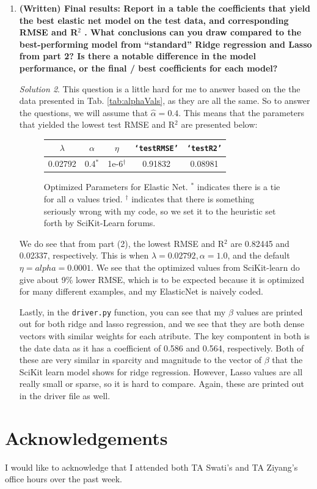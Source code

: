 \documentclass[a4paper,12pt]{article}
\theoremstyle{definition}
\theoremstyle{remark}
\newtheorem*{solution}{Solution}
\begin{document}
\begin{enumerate}
\begin{enumerate}
\begin{solution}
		\end{solution}
		\item {\bf (Written) Final results: Report in a table the coefficients that yield the best elastic net model on the
			test data, and corresponding RMSE and R$^2$ . What conclusions can you draw compared to the best-performing model from “standard” Ridge regression and Lasso from part 2? Is there a notable difference in the model performance, or the final / best coefficients for each model?}
			\begin{solution}
				This question is a little hard for me to answer based on the the data presented in Tab. \ref{tab:alphaVals}, as they are all the same. So to answer the questions, we will assume that $\hat{\alpha} = 0.4$. This means that the parameters that yielded the lowest test RMSE and R$^2$ are presented below:
				\begin{figure}
					\centering
					\begin{tabular}{|c|c|c|c|c|}
						\hline
						$\lambda$& $\alpha$ &$\eta$  &\texttt{`testRMSE'}  & \texttt{`testR2'} \\
						\hline
						0.02792& 0.4$^\ast$ &1e-6$^{\dagger}$  & 	0.91832&0.08981 \\
						\hline
					\end{tabular}
					\caption{Optimized Parameters for Elastic Net. $^\ast$ indicates there is a tie for all $\alpha$ values tried. $^\dagger$ indicates that there is something seriously wrong with my code, so we set it to the heuristic set forth by SciKit-Learn forums. }
				\end{figure}
				We do see that from part (2), the  lowest RMSE and R$^2$ are 0.82445 and 0.02337, respectively. This is when $\lambda = 0.02792, \alpha = 1.0$, and the default $\eta = alpha=0.0001$. We see that the optimized values from SciKit-learn do give about 9\% lower RMSE, which is to be expected because it is optimized for many different examples, and my ElasticNet is naively coded. 
				
				Lastly, in the \texttt{driver.py} function, you can see that my $\beta$ values are printed out for both ridge and lasso regression, and we see that they are both dense vectors with similar weights for each atribute. The key compontent in both is the date data as it has a coefficient of 0.586 and 0.564, respectively. Both of these are very similar in sparcity and magnitude to the vector of $\beta$ that the SciKit learn model shows for ridge regression. However, Lasso values are all really small or sparse, so it is hard to compare. Again, these are printed out in the driver file as well.
			\end{solution}
		\end{enumerate}
		
\end{enumerate}
	
	
		
	
	\section*{Acknowledgements}
	I would like to acknowledge that I attended both TA Swati's and TA Ziyang's office hours over the past week.
	
\end{document}
